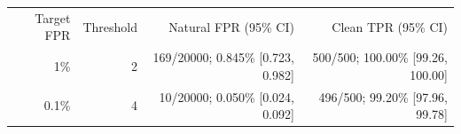 \begin{tabular}{rrrr}
\hline
Target FPR & Threshold & Natural FPR (95\% CI) & Clean TPR (95\% CI) \\
1\% & 2 & 169/20000; 0.845\% [0.723, 0.982] & 500/500; 100.00\% [99.26, 100.00] \\
0.1\% & 4 & 10/20000; 0.050\% [0.024, 0.092] & 496/500; 99.20\% [97.96, 99.78] \\
\hline
\end{tabular}

